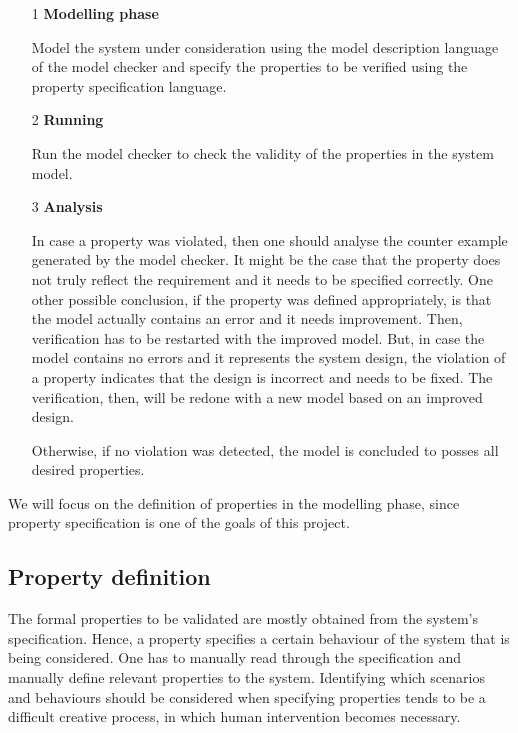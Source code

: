 \begin{itemize}

\item[1] \textbf{Modelling phase}

	Model the system under consideration using the model description language of the model checker and specify the properties to be verified using the property specification language.

\item[2] \textbf{Running}

	Run the model checker to check the validity of the properties in the system model.

\item[3] \textbf{Analysis}

In case a property was violated, then one should analyse the counter example generated by the model checker. It might be the case that the property does not truly reflect the requirement and it needs to be specified correctly. One other possible conclusion, if the property was defined appropriately, is that the model actually contains an  error and it needs improvement. Then, verification has to be restarted with the improved model. But, in case the model contains no errors and it represents the system design, the violation of a property indicates that the design is incorrect and needs to be fixed. The verification, then, will be redone with a new model based on an improved design.
	
Otherwise, if no violation was detected, the model is concluded to posses all desired properties.

\end{itemize}

We will focus on the definition of properties in the modelling phase, since property specification is one of the goals of this project.

\subsection{Property definition}

The formal properties to be validated are mostly obtained from the system's specification\cite{Baier}. Hence, a property specifies a certain behaviour of the system that is being considered. One has to manually read through the specification and manually define relevant properties to the system. Identifying which scenarios and behaviours should be considered when specifying properties tends to be a difficult creative process, in which human intervention becomes necessary. 

